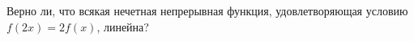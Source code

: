 \documentclass{article}
\begin{document}
Верно ли, что всякая нечетная непрерывная функция, удовлетворяющая условию $f(2x) = 2f(x)$, линейна?
\end{document}
